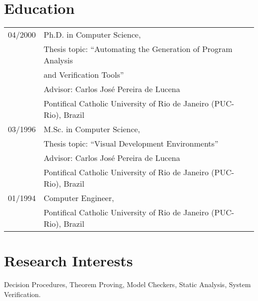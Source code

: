 \documentclass{article}
\newcommand{\job}[4]{\begin{flushleft}
                                        \begin{tabular}{ll}
                                         #1-- & #3 \\
                     #2 & #4 \\
                    \end{tabular}
                                        \end{flushleft}
                    }
\begin{document}

\section*{Education}

\begin{tabular}{ll}
04/2000 & Ph.D. in Computer Science, \\
            & Thesis topic: ``Automating the Generation of Program Analysis \\
                & and Verification Tools'' \\
                & Advisor: Carlos Jos\'e Pereira de Lucena \\
        & Pontifical Catholic University of Rio de Janeiro (PUC-Rio), Brazil \\
03/1996 & M.Sc. in Computer Science, \\
                & Thesis topic: ``Visual Development Environments'' \\
                & Advisor: Carlos Jos\'e Pereira de Lucena \\
        & Pontifical Catholic University of Rio de Janeiro (PUC-Rio), Brazil \\
01/1994 & Computer Engineer, \\
        & Pontifical Catholic University of Rio de Janeiro (PUC-Rio), Brazil \\
\end{tabular}

\section*{Research Interests}

Decision Procedures, Theorem Proving, Model Checkers, Static Analysis, System Verification.
\end{document}
